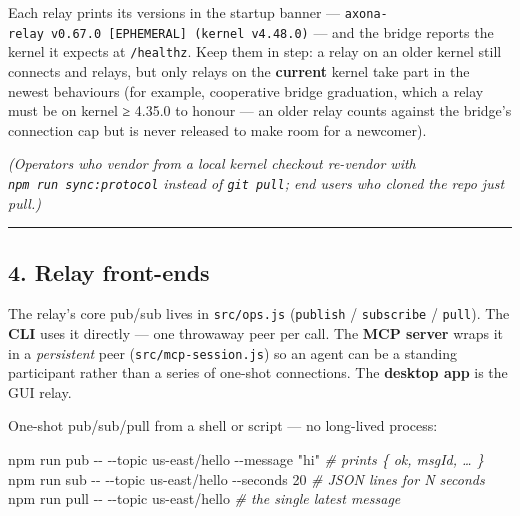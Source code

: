 \documentclass[
  nobib]{tufte-handout}
\newenvironment{Shaded}{}{}
\newcommand{\AttributeTok}[1]{\textcolor[rgb]{0.49,0.56,0.16}{#1}}
\newcommand{\CommentTok}[1]{\textcolor[rgb]{0.38,0.63,0.69}{\textit{#1}}}
\newcommand{\ExtensionTok}[1]{#1}
\newcommand{\NormalTok}[1]{#1}
\newcommand{\StringTok}[1]{\textcolor[rgb]{0.25,0.44,0.63}{#1}}
\renewcommand{\subsubsection}[1]{\medskip\par\noindent{\normalsize\bfseries #1}\par\nobreak\smallskip}
\begin{document}
Each relay prints its versions in the startup banner ---
\texttt{axona-relay\ v0.67.0\ {[}EPHEMERAL{]}\ (kernel\ v4.48.0)} ---
and the bridge reports the kernel it expects at \texttt{/healthz}. Keep
them in step: a relay on an older kernel still connects and relays, but
only relays on the \textbf{current} kernel take part in the newest
behaviours (for example, cooperative bridge graduation, which a relay
must be on kernel ≥ 4.35.0 to honour --- an older relay counts against
the bridge's connection cap but is never released to make room for a
newcomer).

\emph{(Operators who vendor from a local kernel checkout re-vendor with
\texttt{npm\ run\ sync:protocol} instead of \texttt{git\ pull}; end
users who cloned the repo just pull.)}

\begin{center}\rule{0.5\linewidth}{0.5pt}\end{center}

\subsection{4. Relay front-ends}\label{relay-front-ends}

The relay's core pub/sub lives in \texttt{src/ops.js} (\texttt{publish}
/ \texttt{subscribe} / \texttt{pull}). The \textbf{CLI} uses it directly
--- one throwaway peer per call. The \textbf{MCP server} wraps it in a
\emph{persistent} peer (\texttt{src/mcp-session.js}) so an agent can be
a standing participant rather than a series of one-shot connections. The
\textbf{desktop app} is the GUI relay.

\subsubsection{\texorpdfstring{4a. CLI
(\texttt{axona-cli})}{4a. CLI (axona-cli)}}\label{a.-cli-axona-cli}

One-shot pub/sub/pull from a shell or script --- no long-lived process:

\begin{Shaded}
\begin{Highlighting}[]
\ExtensionTok{npm}\NormalTok{ run pub  }\AttributeTok{{-}{-}} \AttributeTok{{-}{-}topic}\NormalTok{ us{-}east/hello }\AttributeTok{{-}{-}message} \StringTok{"hi"}          \CommentTok{\# prints \{ ok, msgId, … \}}
\ExtensionTok{npm}\NormalTok{ run sub  }\AttributeTok{{-}{-}} \AttributeTok{{-}{-}topic}\NormalTok{ us{-}east/hello }\AttributeTok{{-}{-}seconds}\NormalTok{ 20            }\CommentTok{\# JSON lines for N seconds}
\ExtensionTok{npm}\NormalTok{ run pull }\AttributeTok{{-}{-}} \AttributeTok{{-}{-}topic}\NormalTok{ us{-}east/hello                         }\CommentTok{\# the single latest message}
\end{Highlighting}
\end{Shaded}
\end{document}
